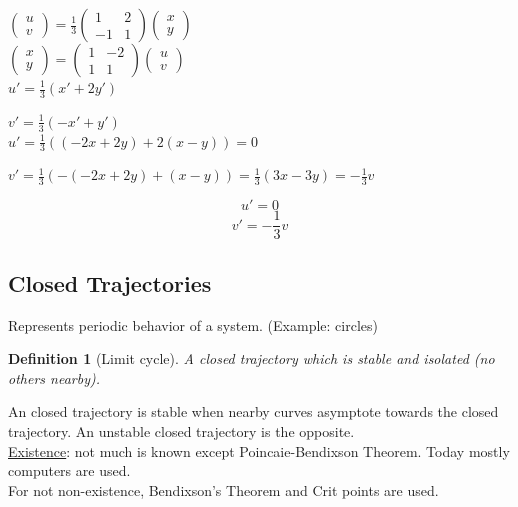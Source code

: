 \documentclass[12pt]{article}
\newtheorem{definition}{Definition}[section]
\numberwithin{equation}{subsection}
\newcommand{\indb}{\hspace{1cm}}
\newcommand{\inde}{\hspace{2.5cm}}
\begin{document}
\indb $\begin{pmatrix}
u \\ v
\end{pmatrix}=\frac{1}{3}\begin{pmatrix}
1 & 2 \\ -1 & 1
\end{pmatrix}\begin{pmatrix}
x \\ y
\end{pmatrix}$\\

\indb $\begin{pmatrix}
x \\ y
\end{pmatrix}=\begin{pmatrix}
1 & -2 \\ 1 & 1
\end{pmatrix}\begin{pmatrix}
u \\ v
\end{pmatrix}$\\

\inde $u'=\frac{1}{3}(x'+2y')$

\inde $v'=\frac{1}{3}(-x'+y')$\\

\inde $u'=\frac{1}{3}((-2x+2y)+2(x-y))=0$

\inde $v'=\frac{1}{3}(-(-2x+2y)+(x-y))=\frac{1}{3}(3x-3y)=-\frac{1}{3}v$

$$ u'=0$$ 
$$ v'=-\frac{1}{3}v $$


\newpage
\subsection{Closed Trajectories}
Represents periodic behavior of a system. (Example: circles)

\begin{definition}[Limit cycle] 
A closed trajectory which is stable and isolated (no others nearby).
\end{definition}

An closed trajectory is stable when nearby curves asymptote towards the closed trajectory. An unstable closed trajectory is the opposite.\\

\underline{Existence}: not much is known except Poincaie-Bendixson Theorem. Today mostly computers are used.\\


For not non-existence, Bendixson's Theorem and Crit points are used.
\end{document}
